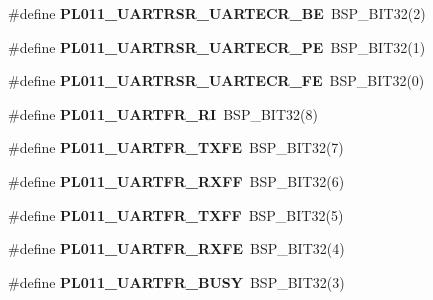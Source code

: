 \begin{DoxyCompactItemize}
\mbox{\label{arm-pl011-regs_8h_adcb243818683ac3dc88579a52a8a7a22}} 
\#define {\bfseries P\+L011\+\_\+\+U\+A\+R\+T\+R\+S\+R\+\_\+\+U\+A\+R\+T\+E\+C\+R\+\_\+\+BE}~B\+S\+P\+\_\+\+B\+I\+T32(2)
\item 
\mbox{\label{arm-pl011-regs_8h_ad5c37ac14129dc7fa9055b1f9ca94248}} 
\#define {\bfseries P\+L011\+\_\+\+U\+A\+R\+T\+R\+S\+R\+\_\+\+U\+A\+R\+T\+E\+C\+R\+\_\+\+PE}~B\+S\+P\+\_\+\+B\+I\+T32(1)
\item 
\mbox{\label{arm-pl011-regs_8h_aa34db4f79a4d4ea1af388802916b5adc}} 
\#define {\bfseries P\+L011\+\_\+\+U\+A\+R\+T\+R\+S\+R\+\_\+\+U\+A\+R\+T\+E\+C\+R\+\_\+\+FE}~B\+S\+P\+\_\+\+B\+I\+T32(0)
\item 
\mbox{\label{arm-pl011-regs_8h_a4c6cc9dde46cec09449c65f2e369b543}} 
\#define {\bfseries P\+L011\+\_\+\+U\+A\+R\+T\+F\+R\+\_\+\+RI}~B\+S\+P\+\_\+\+B\+I\+T32(8)
\item 
\mbox{\label{arm-pl011-regs_8h_ae6a28137abd9428e0c749d4905bfff4b}} 
\#define {\bfseries P\+L011\+\_\+\+U\+A\+R\+T\+F\+R\+\_\+\+T\+X\+FE}~B\+S\+P\+\_\+\+B\+I\+T32(7)
\item 
\mbox{\label{arm-pl011-regs_8h_a92b9e3af2d15d024c7b560cbccad3569}} 
\#define {\bfseries P\+L011\+\_\+\+U\+A\+R\+T\+F\+R\+\_\+\+R\+X\+FF}~B\+S\+P\+\_\+\+B\+I\+T32(6)
\item 
\mbox{\label{arm-pl011-regs_8h_a102418ede0728087fb35b5c5c0bfcfed}} 
\#define {\bfseries P\+L011\+\_\+\+U\+A\+R\+T\+F\+R\+\_\+\+T\+X\+FF}~B\+S\+P\+\_\+\+B\+I\+T32(5)
\item 
\mbox{\label{arm-pl011-regs_8h_a6b6cfbc33ca5ca19d64fff7c2bbb5052}} 
\#define {\bfseries P\+L011\+\_\+\+U\+A\+R\+T\+F\+R\+\_\+\+R\+X\+FE}~B\+S\+P\+\_\+\+B\+I\+T32(4)
\item 
\mbox{\label{arm-pl011-regs_8h_aec6a82c25820017c17974a5cf6a6bb13}} 
\#define {\bfseries P\+L011\+\_\+\+U\+A\+R\+T\+F\+R\+\_\+\+B\+U\+SY}~B\+S\+P\+\_\+\+B\+I\+T32(3)
\item 
\mbox{\label{arm-pl011-regs_8h_ae59aaf755d4d04c8af1c0d8854b43344}} 

\end{DoxyCompactItemize}
